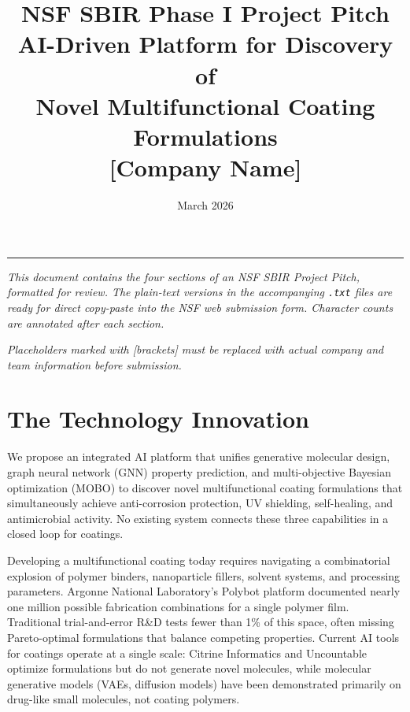 \documentclass[11pt,letterpaper]{article}
\title{%
  \vspace{-1cm}
  \textcolor{nsfblue}{\Large\textbf{NSF SBIR Phase I Project Pitch}}\\[0.3cm]
  \textbf{AI-Driven Platform for Discovery of\\Novel Multifunctional Coating Formulations}\\[0.3cm]
  \large [Company Name]
}
\author{}
\date{March 2026}
\begin{document}
\maketitle
\thispagestyle{fancy}

\noindent\textcolor{nsfblue}{\rule{\textwidth}{1pt}}

\vspace{0.5cm}
\noindent\textit{This document contains the four sections of an NSF SBIR Project Pitch, formatted for review. The plain-text versions in the accompanying \texttt{.txt} files are ready for direct copy-paste into the NSF web submission form. Character counts are annotated after each section.}

\vspace{0.3cm}
\noindent\textit{Placeholders marked with [brackets] must be replaced with actual company and team information before submission.}

\section{The Technology Innovation}

We propose an integrated AI platform that unifies generative molecular design, graph neural network (GNN) property prediction, and multi-objective Bayesian optimization (MOBO) to discover novel multifunctional coating formulations that simultaneously achieve anti-corrosion protection, UV shielding, self-healing, and antimicrobial activity. No existing system connects these three capabilities in a closed loop for coatings.

Developing a multifunctional coating today requires navigating a combinatorial explosion of polymer binders, nanoparticle fillers, solvent systems, and processing parameters. Argonne National Laboratory's Polybot platform documented nearly one million possible fabrication combinations for a single polymer film. Traditional trial-and-error R\&D tests fewer than 1\% of this space, often missing Pareto-optimal formulations that balance competing properties. Current AI tools for coatings operate at a single scale: Citrine Informatics and Uncountable optimize formulations but do not generate novel molecules, while molecular generative models (VAEs, diffusion models) have been demonstrated primarily on drug-like small molecules, not coating polymers.
\end{document}
